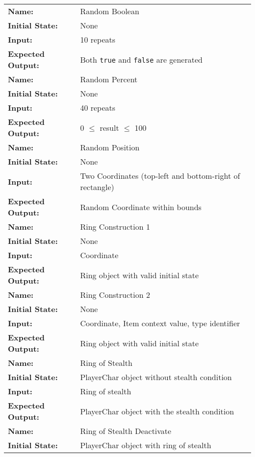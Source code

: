 \documentclass[12pt, titlepage]{article}
\begin{document}
\begin{center}
\begin{longtable}{ l | p{10cm} }
				\hline
				\rule{0pt}{1.5em}\textbf{Name:} & Random Boolean\\
				\textbf{Initial State:} & None\\
				\textbf{Input:} & 10 repeats\\
				\textbf{Expected Output:} & Both \lstinline$true$ and \lstinline$false$ are generated\\[0.6em]
				\hline
				\rule{0pt}{1.5em}\textbf{Name:} & Random Percent\\
				\textbf{Initial State:} & None\\
				\textbf{Input:} & 40 repeats\\
				\textbf{Expected Output:} & 0 $\le$ result $\le$ 100\\[0.6em]
				\hline
				\rule{0pt}{1.5em}\textbf{Name:} & Random Position\\
				\textbf{Initial State:} & None\\
				\textbf{Input:} & Two Coordinates (top-left and bottom-right of rectangle)\\
				\textbf{Expected Output:} & Random Coordinate within bounds\\[0.6em]
				\hline
				\rule{0pt}{1.5em}\textbf{Name:} & Ring Construction 1\\
				\textbf{Initial State:} & None\\
				\textbf{Input:} & Coordinate\\
				\textbf{Expected Output:} & Ring object with valid initial state\\[0.6em]
				\hline
				\rule{0pt}{1.5em}\textbf{Name:} & Ring Construction 2\\
				\textbf{Initial State:} & None\\
				\textbf{Input:} & Coordinate, Item context value, type identifier\\
				\textbf{Expected Output:} & Ring object with valid initial state\\[0.6em]
				\hline
				\rule{0pt}{1.5em}\textbf{Name:} & Ring of Stealth\\
				\textbf{Initial State:} & PlayerChar object without stealth condition\\
				\textbf{Input:} & Ring of stealth\\
				\textbf{Expected Output:} & PlayerChar object with the stealth condition\\[0.6em]
				\hline
				\rule{0pt}{1.5em}\textbf{Name:} & Ring of Stealth Deactivate\\
				\textbf{Initial State:} & PlayerChar object with ring of stealth\\

\end{longtable}
\end{center}
\end{document}
